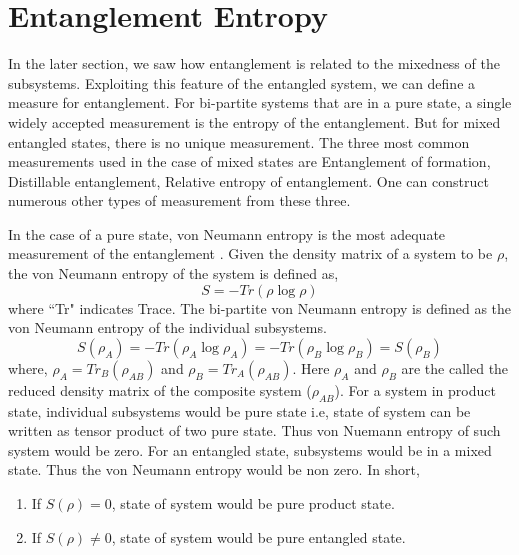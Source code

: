 \documentclass[12pt,a4paper]{report}
\begin{document}
\section{Entanglement Entropy}
In the later section, we saw how entanglement is related to the mixedness of the subsystems. Exploiting this feature of the entangled system, we can define a measure for entanglement. For bi-partite systems that are in a pure state, a single widely accepted measurement is the entropy of the entanglement. But for mixed entangled states, there is no unique measurement. The three most common measurements used in the case of mixed states are Entanglement of formation, Distillable entanglement, Relative entropy of entanglement. One can construct numerous other types of measurement from these three.\par
In the case of a pure state, von Neumann entropy is the most adequate measurement of the entanglement \cite{bennet96c}. Given the density matrix of a system to be $\rho$, the von Neumann entropy of the system is defined as,
\begin{equation}
S = -Tr(\rho\log\rho)
\end{equation}
where ``Tr" indicates Trace. The bi-partite von Neumann entropy is defined as the von Neumann entropy of the individual subsystems.
\begin{equation}
S(\rho_{A}) = -Tr(\rho_{A}\log\rho_{A}) =  -Tr(\rho_{B}\log\rho_{B})=S(\rho_{B})
\end{equation}
where, $\rho_{A}=Tr_{B}(\rho_{AB})$ and $\rho_{B}=Tr_{A}(\rho_{AB})$. Here $\rho_{A}$ and $\rho_{B}$ are the called the reduced density matrix of the composite system ($\rho_{AB}$). For a system in product state, individual subsystems would be pure state i.e, state of system can be written as tensor product of two pure state. Thus von Nuemann entropy of such system would be zero. For an entangled state, subsystems would be in a mixed state. Thus the von Neumann entropy would be non zero. In short,
\begin{enumerate}
    \item If $S(\rho)= 0$, state of system would be pure product state.
    \item If $S(\rho)\neq 0$, state of system would be pure entangled state.
\end{enumerate}
\end{document}
